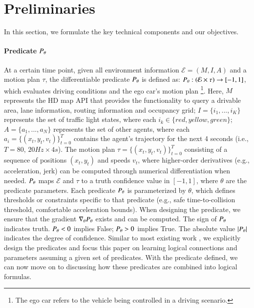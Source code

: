\section{Preliminaries}
\label{sec:problem_formulation}

In this section, we formulate the key technical components and our objectives.

\paragraph{Predicate $P_{\theta}$}
At a certain time point, given all environment information $\mathcal{E} = (M, I, A)$ and a motion plan $\tau$, the differentiable predicate $P_{\theta}$ is defined as: $P_{\theta} : (\mathcal{E} \times \tau) \rightarrow [-1, 1]$, which evaluates driving conditions and the ego car's motion plan \footnote{The ego car refers to the vehicle being controlled in a driving scenario.}. Here, $M$ represents the HD map API that provides the functionality to query a drivable area, lane information, routing information and occupancy grid; $I = \{i_1,...,i_K\}$ represents the set of traffic light states, where each $i_k \in \{\mathit{red, yellow, green}\}$; $A = \{a_1,...,a_N\}$ represents the set of other agents, where each $a_i = \{(x_t, y_t, v_t)\}_{t=0}^{T}$ contains the agent's trajectory for the next 4 seconds (i.e., $T = 80$, $20Hz \times 4 s$). The motion plan $\tau = \{(x_t, y_t, v_t)\}_{t=0}^{T}$  consisting of a sequence of positions $(x_t, y_t)$ and speeds $v_t$, where higher-order derivatives (e.g., acceleration, jerk) can be computed through numerical differentiation when needed.
$P_{\theta}$ maps $\mathcal{E}$ and $\tau$ to a truth confidence value in $[-1,1]$, where $\theta$ are the predicate parameters. Each predicate $P_{\theta}$ is parameterized by $\theta$, which defines thresholds or constraints specific to that predicate (e.g., safe time-to-collision threshold, comfortable acceleration bounds). When designing the predicate, we ensure that the gradient $\nabla_{\theta} P_{\theta}$ exists and can be computed. The sign of $P_{\theta}$ indicates truth. $P_{\theta} < 0$ implies False; $P_{\theta} > 0$ implies True. The absolute value $|P_{\theta}|$ indicates the degree of confidence.
Similar to most existing work \cite{bartocci2022survey}, we explicitly design the predicates and focus this paper on learning logical connections and parameters assuming a given set of predicates. With the predicate defined, we can now move on to discussing how these predicates are combined into logical formulas.

